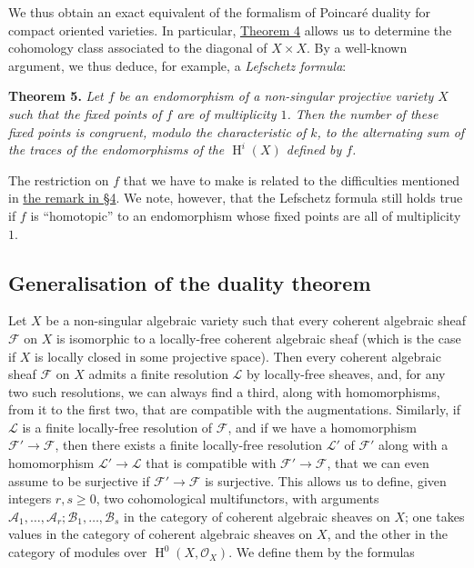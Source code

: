 \documentclass{article}
\newenvironment{itenv}[1]
  {\phantomsection\par\smallskip\noindent\textbf{#1.}\itshape}
  {\par\smallskip}
\newcommand{\oldpage}[1]{\marginpar{\footnotesize$\Big\vert$ \textit{p.~#1}}}
\theoremstyle{definition}
\theoremstyle{definition}
\theoremstyle{definition}
\theoremstyle{definition}
\theoremstyle{remark}
\begin{document}
We thus obtain an exact equivalent of the formalism of Poincaré duality for compact oriented varieties.
In particular, \protect\hyperlink{fga-1-theorem-4}{Theorem 4} allows us to determine the cohomology class associated to the diagonal of \(X\times X\).
By a well-known argument, we thus deduce, for example, a \emph{Lefschetz formula}:

\leavevmode{}%
\begin{itenv}{Theorem 5}
Let \(f\) be an endomorphism of a non-singular projective variety \(X\) such that the fixed points of \(f\) are of multiplicity \(1\).
Then the number of these fixed points is congruent, modulo the characteristic of \(k\), to the alternating sum of the traces of the endomorphisms of the \(\operatorname{H}^i(X)\) defined by \(f\).

\end{itenv}

The restriction on \(f\) that we have to make is related to the difficulties mentioned in \protect\hyperlink{fga-1-section-4-remark}{the remark in §4}.
We note, however, that the Lefschetz formula still holds true if \(f\) is ``homotopic'' to an endomorphism whose fixed points are all of multiplicity \(1\).

\hypertarget{fga-1-section-8}{%
\subsection{Generalisation of the duality theorem}\label{fga-1-section-8}}

Let \(X\) be a non-singular algebraic variety such that every coherent algebraic sheaf \({\mathscr{F}}\) on \(X\) is isomorphic to a locally-free coherent algebraic sheaf (which is the case if \(X\) is locally closed in some projective space).
Then every coherent algebraic sheaf \({\mathscr{F}}\) on \(X\) admits a finite resolution \({\mathscr{L}}\) by locally-free sheaves, and, for any two such resolutions, we can always find a third, along with homomorphisms, from it to the first two, that are compatible with the augmentations.
Similarly, if \({\mathscr{L}}\) is a finite locally-free resolution of \({\mathscr{F}}\), and if we have a homomorphism \({\mathscr{F}}'\to{\mathscr{F}}\), then there exists a finite locally-free resolution \({\mathscr{L}}'\) of \({\mathscr{F}}'\) along with a homomorphism \({\mathscr{L}}'\to{\mathscr{L}}\) that is compatible with \({\mathscr{F}}'\to{\mathscr{F}}\), that we can even assume to be surjective if \({\mathscr{F}}'\to{\mathscr{F}}\) is surjective.
This allows us to define, given integers \(r,s\geqslant 0\), two cohomological multifunctors, with arguments \({\mathscr{A}}_1,\ldots,{\mathscr{A}}_r;{\mathscr{B}}_1,\ldots,{\mathscr{B}}_s\) in the category of coherent algebraic sheaves on \(X\);
one takes values in the category of coherent algebraic sheaves on \(X\), and the other in the category of modules over \(\operatorname{H}^0(X,{\mathscr{O}}_X)\).
\oldpage{149-22}We define them by the formulas
\end{document}
